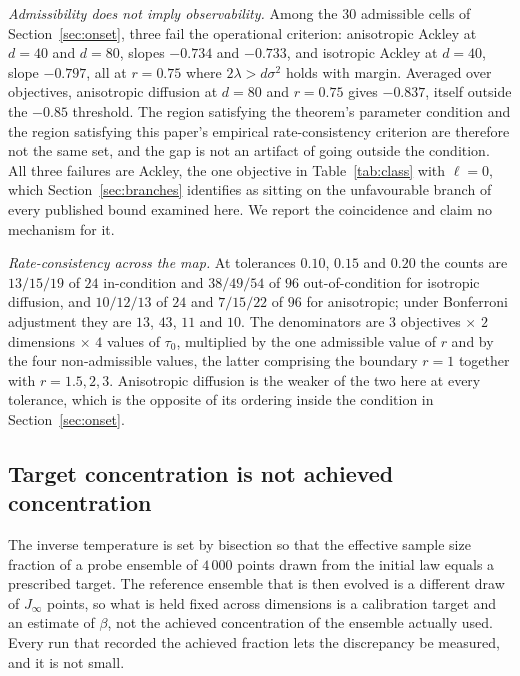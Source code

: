 \documentclass[pdflatex,sn-mathphys-num]{sn-jnl}
\theoremstyle{thmstyleone}
\theoremstyle{thmstyletwo}
\theoremstyle{thmstylethree}
\begin{document}
\emph{Admissibility does not imply observability.} Among the $30$ admissible cells of Section~\ref{sec:onset}, three fail the operational criterion: anisotropic Ackley at $d=40$ and $d=80$, slopes $-0.734$ and $-0.733$, and isotropic Ackley at $d=40$, slope $-0.797$, all at $r=0.75$ where $2\lambda>d\sigma^2$ holds with margin. Averaged over objectives, anisotropic diffusion at $d=80$ and $r=0.75$ gives $-0.837$, itself outside the $-0.85$ threshold. The region satisfying the theorem's parameter condition and the region satisfying this paper's empirical rate-consistency criterion are therefore not the same set, and the gap is not an artifact of going outside the condition. All three failures are Ackley, the one objective in Table~\ref{tab:class} with $\ell=0$, which Section~\ref{sec:branches} identifies as sitting on the unfavourable branch of every published bound examined here. We report the coincidence and claim no mechanism for it.

\emph{Rate-consistency across the map.} At tolerances $0.10$, $0.15$ and $0.20$ the counts are $13/15/19$ of $24$ in-condition and $38/49/54$ of $96$ out-of-condition for isotropic diffusion, and $10/12/13$ of $24$ and $7/15/22$ of $96$ for anisotropic; under Bonferroni adjustment they are $13$, $43$, $11$ and $10$. The denominators are $3$ objectives $\times$ $2$ dimensions $\times$ $4$ values of $\tau_0$, multiplied by the one admissible value of $r$ and by the four non-admissible values, the latter comprising the boundary $r=1$ together with $r=1.5,2,3$. Anisotropic diffusion is the weaker of the two here at every tolerance, which is the opposite of its ordering inside the condition in Section~\ref{sec:onset}.

\subsection{Target concentration is not achieved concentration}\label{sec:calib}

The inverse temperature is set by bisection so that the effective sample size fraction of a probe ensemble of $4\,000$ points drawn from the initial law equals a prescribed target. The reference ensemble that is then evolved is a different draw of $J_\infty$ points, so what is held fixed across dimensions is a calibration target and an estimate of $\beta$, not the achieved concentration of the ensemble actually used. Every run that recorded the achieved fraction lets the discrepancy be measured, and it is not small.
\end{document}

